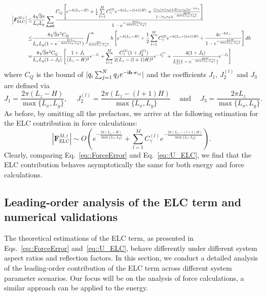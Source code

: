 \begin{equation}
\resizebox{0.98\hsize}{!}{$
\begin{split}
\left|\bm{F}_{\text{ELC}}^{M,i}\right|\leq &\frac{4\sqrt{3}\pi}{L_xL_y}\sum_{\bm{h}\neq \bm{0}} \frac{C_Q\left[e^{-h(L_z-H)}+\frac{1}{2}\sum\limits_{l=1}^{M}C^{(l)}_{\gamma}e^{-h(L_z-(l+1)H)}+\frac{(|\gamma_{\T u}|+|\gamma_{\T d}| + 2|\gamma_{\T u}\gamma_{\T d}|)e^{-hL_z}}{1-|\gamma_{\T u}\gamma_{\T d}|e^{-\frac{4\pi H}{\max\{L_x,L_y\}}}}\right]}{1-e^{-\frac{2\pi L_z}{\max\{L_x,L_y\}}}}\\
\leq& \frac{8\sqrt{3}\pi^2 C_Q}{L_xL_y(1-e^{-\frac{2\pi L_z}{\max\{L_x,L_y\}}})}\int_{\frac{2\pi}{\max\{L_x,L_y\}}}^{\infty}h\left[e^{-h(L_z-H)}+\frac{1}{2}\sum\limits_{l=1}^{M}C^{(l)}_{\gamma}e^{-h(L_z-(l+1)H)}+\frac{4e^{-hL_z}}{1-e^{-\frac{4\pi H}{\max\{L_x,L_y\}}}}\right]dh\\
=&\frac{8\sqrt{3}\pi^2 C_Q}{L_xL_y(1-J_3)}\left[\frac{1+J_1}{(L_z-H)^2}e^{-J_1}+\sum_{l=1}^{M}\frac{C_{\gamma}^{(l)}(1+J_2^{(l)})}{2(L_z-(l+1)H)^2}e^{-J_2^{(l)}}+\frac{4(1+J_3)}{L_z^2(1-e^{-\frac{4\pi H}{\max\{L_x,L_y\}}})}e^{-J_3}\right]
\end{split}
$}
\end{equation}
where $C_Q$ is the bound of $|q_i\sum_{j=1}^{N}q_je^{-\mathsf i \bm{h}\cdot\bm{r}_{ij}}|$ and the coefficients $J_1$, $J_2^{(l)}$ and $J_3$ are defined via
\begin{equation}
J_1=\frac{2\pi(L_z-H)}{\max\{L_x,L_y\}},\quad\; J_2^{(l)}= \frac{2\pi(L_z-(l+1)H)}{\max\{L_x,L_y\}}\quad \;\text{and} \quad \; J_3=\frac{2\pi L_z}{\max\{L_x,L_y\}}.
\end{equation}
As before, by omitting all the prefactors, we arrive at the following estimation for the ELC contribution in force calculations:
\begin{equation}\label{eq::ForceError}
\left|\bm{F}_{\text{ELC}}^{M,i}\right|\sim O\left(e^{-\frac{2\pi(L_z-H)}{\max\{L_x,L_y\}}}+\sum_{l=1}^{M}C_{\gamma}^{(l)}e^{-\frac{2\pi(L_z-(l+1)H)}{\max\{L_x,L_y\}}}\right).
\end{equation}
Clearly, comparing Eq.~\eqref{eq::ForceError} and Eq.~\eqref{eq::U_ELC}, we find that the ELC contribution behaves asymptotically the same for both energy and force calculations.

\subsection{Leading-order analysis of the ELC term and numerical validations}\label{sec::leadingerr}
The theoretical estimations of the ELC term, as presented in Eqs.~\eqref{eq::ForceError} and~\eqref{eq::U_ELC}, behave differently under different system aspect ratios and reflection factors.
In this section, we conduct a detailed analysis of the leading-order contribution of the ELC term across different system parameter scenarios. 
Our focus will be on the analysis of force calculations, a similar approach can be applied to the energy.

